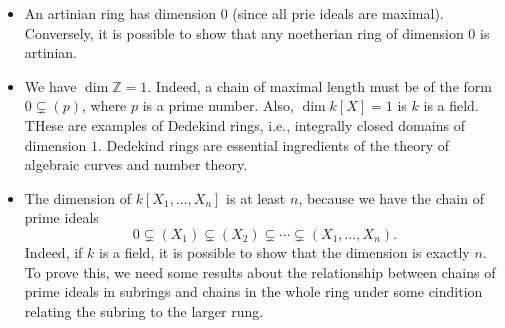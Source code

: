 \begin{itemize}
	\item An artinian ring has dimension $0$ (since all prie ideals are maximal).
		Conversely, it is possible to show that any noetherian ring of dimension $0$
		is artinian.
	\item We have $\dim \mathbb{Z} = 1$. Indeed, a chain of maximal length must be of the
		form $0 \subsetneq (p)$, where $p$ is a prime number. Also, $\dim k[X] = 1$
		is $k$ is a field. THese are examples of Dedekind rings, i.e., integrally
		closed domains of dimension $1$. Dedekind rings are essential ingredients of
		the theory of algebraic curves and number theory.
	\item The dimension of $k[X_1, \ldots, X_n]$ is at least $n$, because we have
		the chain of prime ideals
		\[ 0 \subsetneq (X_1) \subsetneq (X_2)\subsetneq\cdots\subsetneq (X_1, \ldots, X_n). \]
		Indeed, if $k$ is a field, it is possible to show that the dimension is exactly
		$n$. To prove this, we need some results about the relationship between chains
		of prime ideals in subrings and chains in the whole ring under some cindition
		relating the subring to the larger rung.
\end{itemize}
